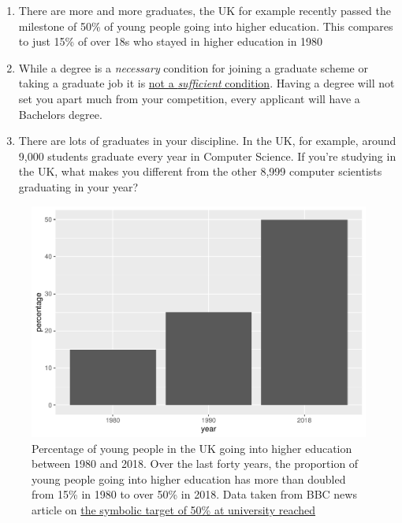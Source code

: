 \documentclass[
]{book}
\providecommand{\tightlist}{%
  \setlength{\itemsep}{0pt}\setlength{\parskip}{0pt}}
\begin{document}
\begin{enumerate}
\def\labelenumi{\arabic{enumi}.}
\tightlist
\item
  There are more and more graduates, the UK for example recently passed the milestone of 50\% of young people going into higher education. This compares to just 15\% of over 18s who stayed in higher education in 1980 \citep{lotsofgrads}
\item
  While a degree is a \emph{necessary} condition for joining a graduate scheme or taking a graduate job it is \href{https://en.wikipedia.org/wiki/Necessity_and_sufficiency}{not a \emph{sufficient} condition}. Having a degree will not set you apart much from your competition, every applicant will have a Bachelors degree.
\item
  There are lots of graduates in your discipline. In the UK, for example, around 9,000 students graduate every year in Computer Science. If you're studying in the UK, what makes you different from the other 8,999 computer scientists graduating in your year?
\end{enumerate}

\begin{figure}

{\centering \includegraphics[width=1\linewidth]{cdyf_files/figure-latex/lotsofgrads-fig-1} 

}

\caption{Percentage of young people in the UK going into higher education between 1980 and 2018. Over the last forty years, the proportion of young people going into higher education has more than doubled from 15\% in 1980 to over 50\% in 2018. Data taken from BBC news article on \href{https://www.bbc.co.uk/news/education-49841620}{the symbolic target of 50\% at university reached} \citep{lotsofgrads}}\label{fig:lotsofgrads-fig}
\end{figure}
\end{document}
